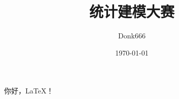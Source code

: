 \documentclass[UTF8]{ctexart}
\title{统计建模大赛}
\author{Donk666}
\date{\today}
\begin{document}
\maketitle

你好，LaTeX！
\end{document}

